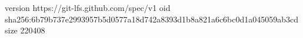 version https://git-lfs.github.com/spec/v1
oid sha256:6b79b737e2993957b5d0577a18d742a8393d1b8a821a6c6bc0d1a045059ab3cd
size 220408
